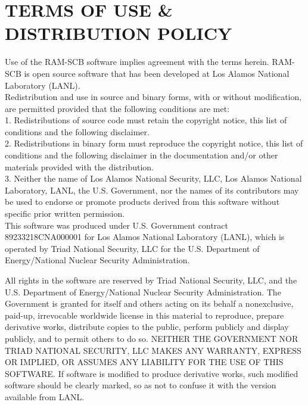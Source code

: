 \section{TERMS OF USE \& DISTRIBUTION POLICY}

Use of the RAM-SCB software implies agreement with the terms herein. RAM-SCB is open source software that has been developed at Los Alamos National Laboratory (LANL). \\

\noindent
Redistribution and use in source and binary forms, with or without modification, are permitted provided that the following conditions are met: \\

1. Redistributions of source code must retain the copyright notice, this list of conditions and the following disclaimer. \\

2. Redistributions in binary form must reproduce the copyright notice, this list of conditions and the following disclaimer in the documentation and/or other materials provided with the distribution. \\

3. Neither the name of Los Alamos National Security, LLC, Los Alamos National Laboratory, LANL, the U.S. Government, nor the names of its contributors may be used to endorse or promote products derived from this software without specific prior written permission. \\

\noindent
This software was produced under U.S. Government contract 89233218CNA000001 for Los Alamos National Laboratory (LANL), which is operated by Triad National Security, LLC for the U.S. Department of Energy/National Nuclear Security Administration.

All rights in the software are reserved by Triad National Security, LLC, and the U.S. Department of Energy/National Nuclear Security Administration. The Government is granted for itself and others acting on its behalf a nonexclusive, paid-up, irrevocable worldwide license in this material to reproduce, prepare derivative works, distribute copies to the public, perform publicly and display publicly, and to permit others to do so. NEITHER THE GOVERNMENT NOR TRIAD NATIONAL SECURITY, LLC MAKES ANY WARRANTY, EXPRESS OR IMPLIED, OR ASSUMES ANY LIABILITY FOR THE USE OF THIS SOFTWARE.  If software is modified to produce derivative works, such modified software should be clearly marked, so as not to confuse it with the version available from LANL.

